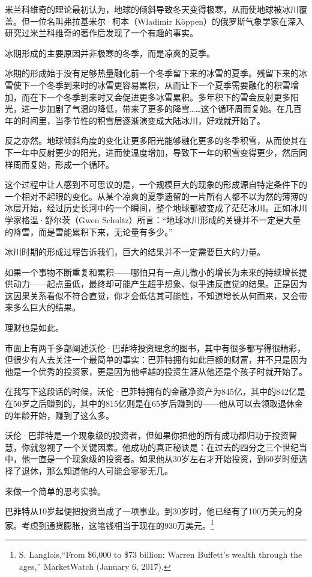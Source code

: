 米兰科维奇的理论最初认为，地球的倾斜导致冬天变得极寒，从而使地球被冰川覆盖。但一位名叫弗拉基米尔·柯本（Wladimir Köppen）的俄罗斯气象学家在深入研究过米兰科维奇的著作后发现了一个有趣的事实。

冰期形成的主要原因并非极寒的冬季，而是凉爽的夏季。

冰期的形成始于没有足够热量融化前一个冬季留下来的冰雪的夏季。残留下来的冰雪使下一个冬季到来时的冰雪更容易累积，从而让下一个夏季需要融化的积雪增加，而在下一个冬季到来时又会促进更多冰雪累积。多年积下的雪会反射更多阳光，进一步加剧了气温的降低，带来了更多的降雪……这个循环周而复始。在几百年的时间里，当季节性的积雪层逐渐演变成大陆冰川，好戏就开始了。

反之亦然。地球倾斜角度的变化让更多阳光能够融化更多的冬季积雪，从而使其在下一年中反射更少的阳光，进而使温度增加，导致下一年的积雪变得更少，然后同样周而复始，形成一个循环。

这个过程中让人感到不可思议的是，一个规模巨大的现象的形成源自特定条件下的一个相对不起眼的变化。从某个凉爽的夏季遗留的一片所有人都不以为然的薄薄的冰层开始，经过历史长河中的一个瞬间，整个地球都被变成了茫茫冰川。正如冰川学家格温·舒尔茨（Gwen Schultz）所言：“地球冰川形成的关键并不一定是大量的降雪，而是雪能累积下来，无论量有多少。”

冰川时期的形成过程告诉我们，巨大的结果并不一定需要巨大的力量。

如果一个事物不断重复和累积——哪怕只有一点儿微小的增长为未来的持续增长提供动力——起点虽低，最终却可能产生超乎想象、似乎违反直觉的结果。正是因为这因果关系看似不符合直觉，你才会低估其可能性，不知道增长从何而来，又会带来多么巨大的结果。

理财也是如此。

市面上有两千多部阐述沃伦·巴菲特投资理念的图书，其中有很多都写得很精彩，但很少有人去关注一个最简单的事实：巴菲特拥有如此巨额的财富，并不只是因为他是一个优秀的投资家，更是因为他卓越的投资生涯从他还是个孩子时就开始了。

在我写下这段话的时候，沃伦·巴菲特拥有的金融净资产为845亿，其中的842亿是在50岁之后赚到的，其中的815亿则是在65岁后赚到的——他从可以去领取退休金的年龄开始，赚到了这么多。

沃伦·巴菲特是一个现象级的投资者，但如果你把他的所有成功都归功于投资智慧，你就忽视了一个关键因素。他成功的真正秘诀是：在过去的四分之三个世纪当中，他一直是一个现象级的投资者。如果他从30岁左右才开始投资，到60岁时便选择了退休，那么知道他的人可能会寥寥无几。

来做一个简单的思考实验。

巴菲特从10岁起便把投资当成了一项事业。到30岁时，他已经有了100万美元的身家。考虑到通货膨胀，这笔钱相当于现在的930万美元。\footnote{S. Langlois,“From \$6,000 to \$73 billion: Warren Buffett’s wealth through the ages,” MarketWatch (January 6, 2017).}

